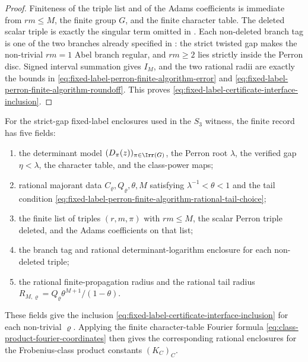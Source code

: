 \begin{proof}
  Finiteness of the triple list and of the Adams coefficients is immediate
  from \(rm\le M\), the finite group \(G\), and the finite character table.  The
  deleted scalar triple is exactly the singular term omitted in
  .
  Each non-deleted branch tag is one of the two branches already specified in
  : the strict twisted gap makes
  the non-trivial \(rm=1\) Abel branch regular, and \(rm\ge2\) lies strictly
  inside the Perron disc.  Signed interval summation gives \(I_M\), and the two
  rational radii are exactly the bounds in
  \eqref{eq:fixed-label-perron-finite-algorithm-error} and
  \eqref{eq:fixed-label-perron-finite-algorithm-roundoff}.  This proves
  \eqref{eq:fixed-label-certificate-interface-inclusion}.
\end{proof}

\begin{lemma}\label{prop:fixed-label-certificate-normal-form}
\label{prop:fixed-label-product-certificate-record}
\label{prop:fixed-label-product-enclosure-check}
\label{prop:fixed-label-five-field-rational-record}
  For the strict-gap fixed-label enclosures used in the \(S_3\) witness, the
  finite record has five fields:
  \begin{enumerate}[label=\textup{(\roman*)},leftmargin=*]
    \item the determinant model \((D_\pi(z))_{\pi\in\Irr(G)}\), the Perron root
      \(\lambda\), the verified gap \(\eta<\lambda\), the character table, and
      the class-power maps;
    \item rational majorant data \(C_\varrho,Q_\varrho,\theta,M\) satisfying
      \(\lambda^{-1}<\theta<1\) and the tail condition
      \eqref{eq:fixed-label-perron-finite-algorithm-rational-tail-choice};
    \item the finite list of triples \((r,m,\pi)\) with \(rm\le M\), the
      scalar Perron triple deleted, and the Adams coefficients on that list;
    \item the branch tag and rational determinant-logarithm enclosure for each
      non-deleted triple;
    \item the rational finite-propagation radius and the rational tail radius
      \(R_{M,\varrho}=Q_\varrho\theta^{M+1}/(1-\theta)\).
  \end{enumerate}
  These fields give the inclusion \eqref{eq:fixed-label-certificate-interface-inclusion}
  for each non-trivial \(\varrho\).  Applying the finite character-table
  Fourier formula \eqref{eq:class-product-fourier-coordinates} then gives the
  corresponding rational enclosures for the Frobenius-class product constants
  \((K_C)_C\).
\end{lemma}

